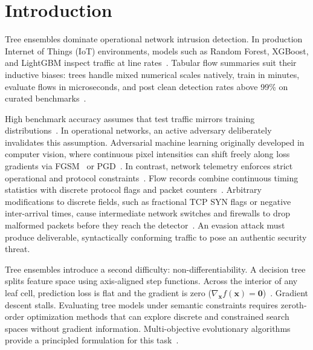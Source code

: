 \documentclass[iicol,pdflatex,sn-mathphys-num]{sn-jnl}
\begin{document}

\maketitle

\section{Introduction}
\label{sec:intro}

Tree ensembles dominate operational network intrusion detection. In production Internet of Things (IoT) environments, models such as Random Forest, XGBoost, and LightGBM inspect traffic at line rates~\cite{breiman2001random,chen2016xgboost,ke2017lightgbm,hussain2020survey}. Tabular flow summaries suit their inductive biases: trees handle mixed numerical scales natively, train in minutes, evaluate flows in microseconds, and post clean detection rates above 99\% on curated benchmarks~\cite{ring2019survey}.

High benchmark accuracy assumes that test traffic mirrors training distributions~\cite{sommer2010outside}. In operational networks, an active adversary deliberately invalidates this assumption. Adversarial machine learning originally developed in computer vision, where continuous pixel intensities can shift freely along loss gradients via FGSM~\cite{goodfellow2014explaining} or PGD~\cite{madry2018towards}. In contrast, network telemetry enforces strict operational and protocol constraints~\cite{corona2013adversarial,apruzzese2022modeling}. Flow records combine continuous timing statistics with discrete protocol flags and packet counters~\cite{pierazzi2020intriguing,sheatsley2022space}. Arbitrary modifications to discrete fields, such as fractional TCP SYN flags or negative inter-arrival times, cause intermediate network switches and firewalls to drop malformed packets before they reach the detector~\cite{apruzzese2022modeling}. An evasion attack must produce deliverable, syntactically conforming traffic to pose an authentic security threat.

Tree ensembles introduce a second difficulty: non-differentiability. A decision tree splits feature space using axis-aligned step functions. Across the interior of any leaf cell, prediction loss is flat and the gradient is zero ($\nabla_{\mathbf{x}} f(\mathbf{x}) = \mathbf{0}$)~\cite{kantchelian2016evasion,chen2019robust}. Gradient descent stalls. Evaluating tree models under semantic constraints requires zeroth-order optimization methods that can explore discrete and constrained search spaces without gradient information. Multi-objective evolutionary algorithms provide a principled formulation for this task~\cite{deb2002nsga,alhajjar2021adversarial}.
\end{document}

